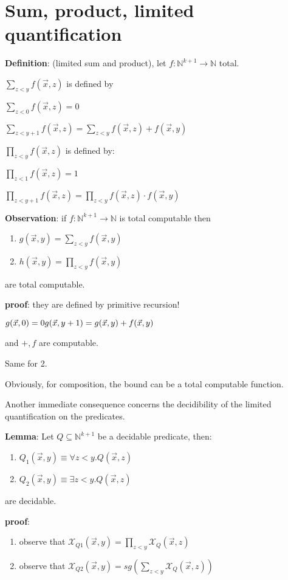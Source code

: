 \documentclass{amsbook}
\newcommand{\nat}{\ensuremath{\mathbb{N}}}
\theoremstyle{definition}
\theoremstyle{remark}
\numberwithin{section}{chapter}
\numberwithin{equation}{chapter}
\begin{document}
\section{Sum, product, limited quantification}

\textbf{Definition}: (limited sum and product), let $f:\nat^{k+1}\rightarrow\nat$ total.

$\sum_{z<y}f(\vec{x},z)$ is defined by

$\sum_{z<0}f(\vec{x},z) = 0$

$\sum_{z<y+1}f(\vec{x},z) = \sum_{z<y}f(\vec{x},z) + f(\vec{x},y)$

$\prod_{z<y}f(\vec{x},z)$ is defined by:

$\prod_{z<1}f(\vec{x},z) = 1$

$\prod_{z<y+1}f(\vec{x},z) = \prod_{z<y}f(\vec{x},z) \cdot f(\vec{x},y)$

\textbf{Observation}: if $f:\nat^{k+1}\rightarrow\nat$ is total computable then
\begin{enumerate}
	\item $g(\vec{x},y) = \sum_{z<y}f(\vec{x},y)$
	\item $h(\vec{x},y) = \prod_{z<y}f(\vec{x},y)$
\end{enumerate}
are total computable.

\textbf{proof}: they are defined by primitive recursion!

$g(\vec{x},0) = 0\\
	g(\vec{x},y+1) = g(\vec{x},y) + f(\vec{x},y)$

and $+,f$ are computable.

Same for 2.

Obviously, for composition, the bound can be a total computable function.

Another immediate consequence concerns the decidibility of the limited quantification on the predicates.

\textbf{Lemma}: Let $Q\subseteq \nat^{k+1}$ be a decidable predicate, then:

\begin{enumerate}
	\item $Q_1(\vec{x},y) \equiv \forall z<y. Q(\vec{x},z)$
	\item $Q_2(\vec{x},y) \equiv \exists z<y. Q(\vec{x},z)$
\end{enumerate}

are decidable.

\textbf{proof}:
\begin{enumerate}
	\item observe that $\mathcal{X}_{Q1}(\vec{x},y) = \prod_{z<y}\mathcal{X}_Q(\vec{x},z)$
	\item observe that $\mathcal{X}_{Q2}(\vec{x},y) = sg(\sum_{z<y}\mathcal{X}_Q(\vec{x},z))$
\end{enumerate}
\end{document}
